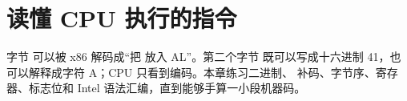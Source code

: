 \chapter{读懂 CPU 执行的指令}

字节  可以被 x86 解码成“把  放入 AL”。第二个字节
既可以写成十六进制 41，也可以解释成字符 A；CPU 只看到编码。本章练习二进制、
补码、字节序、寄存器、标志位和 Intel 语法汇编，直到能够手算一小段机器码。






